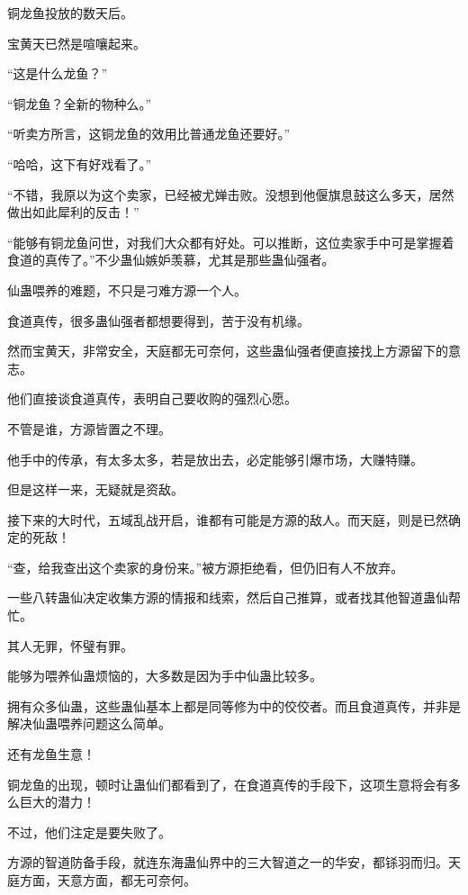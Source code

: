 
\begin{this_body}

铜龙鱼投放的数天后。

宝黄天已然是喧嚷起来。

“这是什么龙鱼？”

“铜龙鱼？全新的物种么。”

“听卖方所言，这铜龙鱼的效用比普通龙鱼还要好。”

“哈哈，这下有好戏看了。”

“不错，我原以为这个卖家，已经被尤婵击败。没想到他偃旗息鼓这么多天，居然做出如此犀利的反击！”

“能够有铜龙鱼问世，对我们大众都有好处。可以推断，这位卖家手中可是掌握着食道的真传了。”不少蛊仙嫉妒羡慕，尤其是那些蛊仙强者。

仙蛊喂养的难题，不只是刁难方源一个人。

食道真传，很多蛊仙强者都想要得到，苦于没有机缘。

然而宝黄天，非常安全，天庭都无可奈何，这些蛊仙强者便直接找上方源留下的意志。

他们直接谈食道真传，表明自己要收购的强烈心愿。

不管是谁，方源皆置之不理。

他手中的传承，有太多太多，若是放出去，必定能够引爆市场，大赚特赚。

但是这样一来，无疑就是资敌。

接下来的大时代，五域乱战开启，谁都有可能是方源的敌人。而天庭，则是已然确定的死敌！

“查，给我查出这个卖家的身份来。”被方源拒绝看，但仍旧有人不放弃。

一些八转蛊仙决定收集方源的情报和线索，然后自己推算，或者找其他智道蛊仙帮忙。

其人无罪，怀璧有罪。

能够为喂养仙蛊烦恼的，大多数是因为手中仙蛊比较多。

拥有众多仙蛊，这些蛊仙基本上都是同等修为中的佼佼者。而且食道真传，并非是解决仙蛊喂养问题这么简单。

还有龙鱼生意！

铜龙鱼的出现，顿时让蛊仙们都看到了，在食道真传的手段下，这项生意将会有多么巨大的潜力！

不过，他们注定是要失败了。

方源的智道防备手段，就连东海蛊仙界中的三大智道之一的华安，都铩羽而归。天庭方面，天意方面，都无可奈何。


\end{this_body}
